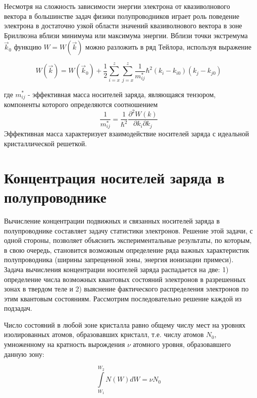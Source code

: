 Несмотря на сложность зависимости энергии электрона от квазиволнового вектора в большинстве задач физики полупроводников
играет роль поведение электрона в достаточно узкой области значений квазиволнового вектора в зоне Бриллюэна вблизи
минимума или максимума энергии. Вблизи точки экстремума $\vec{k}_0$ функцию $W=W(\vec{k})$ можно разложить в ряд Тейлора, используя
выражение

\begin{equation}
	W(\vec{k})=W\left(\vec{k}_{0}\right)+\frac{1}{2} \sum_{i=x}^{z} \sum_{j=x}^{z} \frac{1}{m_{i j}^*} \hbar^{2}\left(k_{i}-k_{i 0}\right)\left(k_{j}-k_{j 0}\right)
	\label{eq:1.7}
\end{equation}

где $m_{i j}^*$ - эффективная масса носителей заряда, являющаяся тензором, компоненты которого определяются соотношением
\begin{equation}
	\frac{1}{m^{*}_{i j}}=\frac{1}{\hbar^{2}} \frac{\partial^{2} W(k)}{\partial k_{i} \partial k_{j}}
	\label{eq:1.8}
\end{equation}
Эффективная масса характеризует взаимодействие носителей заряда с идеальной кристаллической решеткой.

\section{Концентрация носителей заряда в полупроводнике}
Вычисление концентрации подвижных и связанных носителей заряда в полупроводнике составляет задачу статистики электронов.
Решение этой задачи, с одной стороны, позволяет объяснить экспериментальные результаты, по которым, в свою очередь,
становится возможным определение ряда важных характеристик полупроводника (ширины запрещенной зоны, энергия ионизации примеси).
Задача вычисления концентрации носителей заряда распадается на две:  1) определение числа возможных квантовых состояний
электронов в разрешенных зонах в твердом теле и 2) выяснение фактического распределения электронов по этим квантовым
состояниям. Рассмотрим последовательно решение каждой из подзадач.

Число состояний в любой зоне кристалла равно общему числу мест на уровнях изолированных атомов, образовавших кристалл,
т.е. числу атомов $N_0$, умноженному на кратность вырождения $\nu$ атомного уровня, образовавшего данную зону:

\begin{equation}
	\int \limits_{W_1}^{W_2} N(W) dW  =\nu N_0 
	\label{eq:2.1}
\end{equation} 


